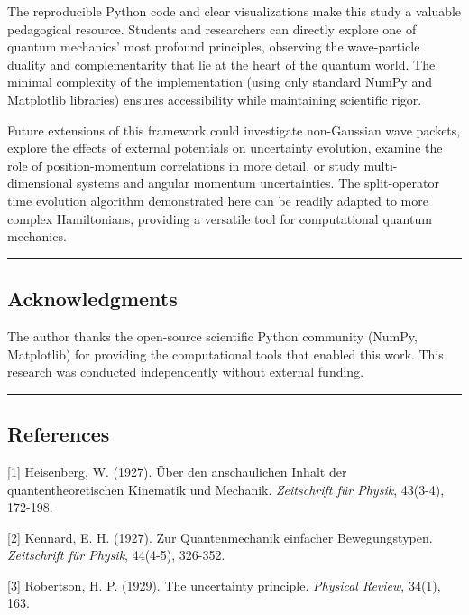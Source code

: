 \documentclass[
]{article}
\begin{document}
The reproducible Python code and clear visualizations make this study a
valuable pedagogical resource. Students and researchers can directly
explore one of quantum mechanics' most profound principles, observing
the wave-particle duality and complementarity that lie at the heart of
the quantum world. The minimal complexity of the implementation (using
only standard NumPy and Matplotlib libraries) ensures accessibility
while maintaining scientific rigor.

Future extensions of this framework could investigate non-Gaussian wave
packets, explore the effects of external potentials on uncertainty
evolution, examine the role of position-momentum correlations in more
detail, or study multi-dimensional systems and angular momentum
uncertainties. The split-operator time evolution algorithm demonstrated
here can be readily adapted to more complex Hamiltonians, providing a
versatile tool for computational quantum mechanics.

\begin{center}\rule{0.5\linewidth}{0.5pt}\end{center}

\subsection{Acknowledgments}\label{acknowledgments}

The author thanks the open-source scientific Python community (NumPy,
Matplotlib) for providing the computational tools that enabled this
work. This research was conducted independently without external
funding.

\begin{center}\rule{0.5\linewidth}{0.5pt}\end{center}

\subsection{References}\label{references}

{[}1{]} Heisenberg, W. (1927). Über den anschaulichen Inhalt der
quantentheoretischen Kinematik und Mechanik. \emph{Zeitschrift für
Physik}, 43(3-4), 172-198.

{[}2{]} Kennard, E. H. (1927). Zur Quantenmechanik einfacher
Bewegungstypen. \emph{Zeitschrift für Physik}, 44(4-5), 326-352.

{[}3{]} Robertson, H. P. (1929). The uncertainty principle.
\emph{Physical Review}, 34(1), 163.
\end{document}
